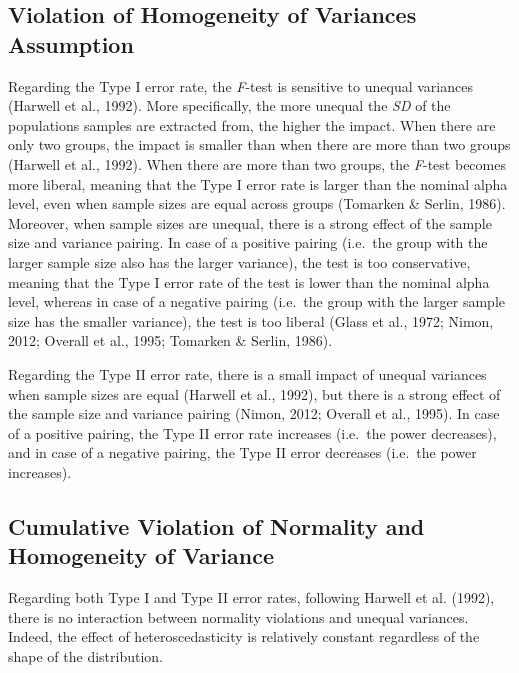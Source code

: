 \documentclass[man,floatsintext]{apa6}
\begin{document}
\hypertarget{violation-of-homogeneity-of-variances-assumption}{%
\subsection{Violation of Homogeneity of Variances Assumption}\label{violation-of-homogeneity-of-variances-assumption}}

Regarding the Type I error rate, the \emph{F}-test is sensitive to unequal variances (Harwell et al., 1992). More specifically, the more unequal the \emph{SD} of the populations samples are extracted from, the higher the impact. When there are only two groups, the impact is smaller than when there are more than two groups (Harwell et al., 1992). When there are more than two groups, the \emph{F}-test becomes more liberal, meaning that the Type I error rate is larger than the nominal alpha level, even when sample sizes are equal across groups (Tomarken \& Serlin, 1986). Moreover, when sample sizes are unequal, there is a strong effect of the sample size and variance pairing. In case of a positive pairing (i.e.~the group with the larger sample size also has the larger variance), the test is too conservative, meaning that the Type I error rate of the test is lower than the nominal alpha level, whereas in case of a negative pairing (i.e.~the group with the larger sample size has the smaller variance), the test is too liberal (Glass et al., 1972; Nimon, 2012; Overall et al., 1995; Tomarken \& Serlin, 1986).

Regarding the Type II error rate, there is a small impact of unequal variances when sample sizes are equal (Harwell et al., 1992), but there is a strong effect of the sample size and variance pairing (Nimon, 2012; Overall et al., 1995). In case of a positive pairing, the Type II error rate increases (i.e.~the power decreases), and in case of a negative pairing, the Type II error decreases (i.e.~the power increases).

\hypertarget{cumulative-violation-of-normality-and-homogeneity-of-variance}{%
\subsection{Cumulative Violation of Normality and Homogeneity of Variance}\label{cumulative-violation-of-normality-and-homogeneity-of-variance}}

Regarding both Type I and Type II error rates, following Harwell et al. (1992), there is no interaction between normality violations and unequal variances. Indeed, the effect of heteroscedasticity is relatively constant regardless of the shape of the distribution.
\end{document}
